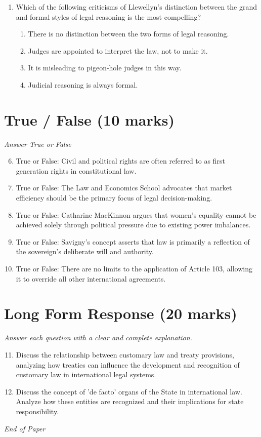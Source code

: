 \documentclass[12pt]{article}
\begin{document}
\begin{enumerate}[label=\arabic*.]
\begin{enumerate}[label=(\alph*)]
    \item Austin
\end{enumerate}
\item Which of the following criticisms of Llewellyn's distinction between the grand and formal styles of legal reasoning is the most compelling?
\begin{enumerate}[label=(\alph*)]
    \item There is no distinction between the two forms of legal reasoning.
    \item Judges are appointed to interpret the law, not to make it.
    \item It is misleading to pigeon-hole judges in this way.
    \item Judicial reasoning is always formal.
\end{enumerate}
\end{enumerate}

\section*{True / False (10 marks)}
\textit{Answer True or False}
\begin{enumerate}[label=\arabic*.]
\setcounter{enumi}{5}
\item True or False: Civil and political rights are often referred to as first generation rights in constitutional law.
\item True or False: The Law and Economics School advocates that market efficiency should be the primary focus of legal decision-making.
\item True or False: Catharine MacKinnon argues that women's equality cannot be achieved solely through political pressure due to existing power imbalances.
\item True or False: Savigny's concept asserts that law is primarily a reflection of the sovereign's deliberate will and authority.
\item True or False: There are no limits to the application of Article 103, allowing it to override all other international agreements.
\end{enumerate}

\section*{Long Form Response (20 marks)}
\textit{Answer each question with a clear and complete explanation.}
\begin{enumerate}[label=\arabic*.]
\setcounter{enumi}{10}
\item Discuss the relationship between customary law and treaty provisions, analyzing how treaties can influence the development and recognition of customary law in international legal systems.
\item Discuss the concept of 'de facto' organs of the State in international law. Analyze how these entities are recognized and their implications for state responsibility.
\end{enumerate}

\vfill
\noindent\textit{End of Paper}
\end{document}
